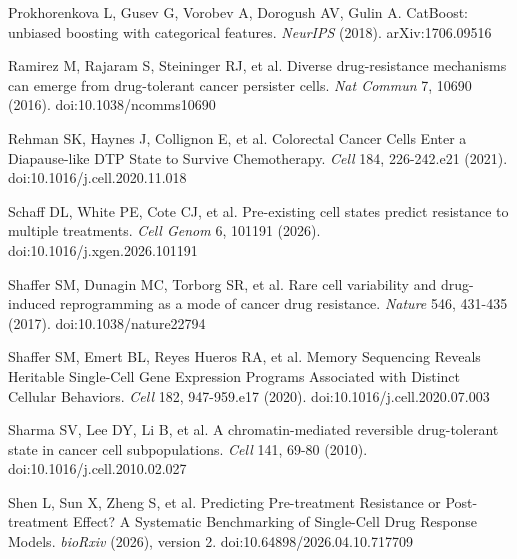 \documentclass[11pt,a4paper]{article}
\begin{document}
\noindent Prokhorenkova L, Gusev G, Vorobev A, Dorogush AV, Gulin A. CatBoost: unbiased boosting with categorical features. \emph{NeurIPS} (2018). arXiv:1706.09516\par\vspace{2pt}

\noindent Ramirez M, Rajaram S, Steininger RJ, et al. Diverse drug-resistance mechanisms can emerge from drug-tolerant cancer persister cells. \emph{Nat Commun} 7, 10690 (2016). doi:10.1038/ncomms10690 \par\vspace{2pt}

\noindent Rehman SK, Haynes J, Collignon E, et al. Colorectal Cancer Cells Enter a Diapause-like DTP State to Survive Chemotherapy. \emph{Cell} 184, 226-242.e21 (2021). doi:10.1016/j.cell.2020.11.018 \par\vspace{2pt}

\noindent Schaff DL, White PE, Cote CJ, et al. Pre-existing cell states predict resistance to multiple treatments. \emph{Cell Genom} 6, 101191 (2026). doi:10.1016/j.xgen.2026.101191 \par\vspace{2pt}

\noindent Shaffer SM, Dunagin MC, Torborg SR, et al. Rare cell variability and drug-induced reprogramming as a mode of cancer drug resistance. \emph{Nature} 546, 431-435 (2017). doi:10.1038/nature22794 \par\vspace{2pt}

\noindent Shaffer SM, Emert BL, Reyes Hueros RA, et al. Memory Sequencing Reveals Heritable Single-Cell Gene Expression Programs Associated with Distinct Cellular Behaviors. \emph{Cell} 182, 947-959.e17 (2020). doi:10.1016/j.cell.2020.07.003 \par\vspace{2pt}

\noindent Sharma SV, Lee DY, Li B, et al. A chromatin-mediated reversible drug-tolerant state in cancer cell subpopulations. \emph{Cell} 141, 69-80 (2010). doi:10.1016/j.cell.2010.02.027 \par\vspace{2pt}

\noindent Shen L, Sun X, Zheng S, et al. Predicting Pre-treatment Resistance or Post-treatment Effect? A Systematic Benchmarking of Single-Cell Drug Response Models. \emph{bioRxiv} (2026), version 2. doi:10.64898/2026.04.10.717709 \par\vspace{2pt}
\end{document}
